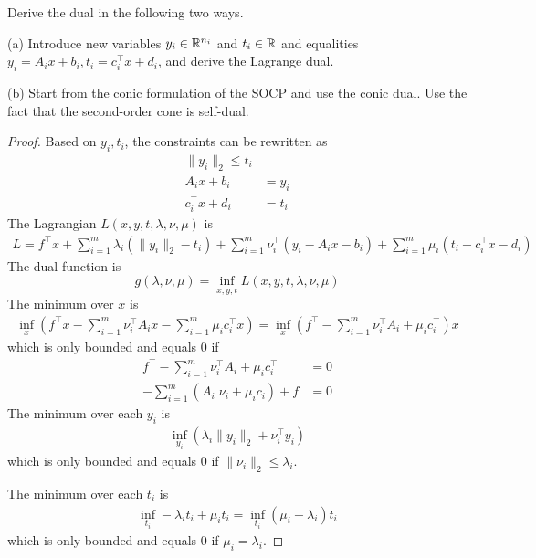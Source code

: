 \documentclass[11pt]{article}
\newcommand{\T}{^\top}          %
\begin{document}
Derive the dual in the following two ways.

(a) Introduce new variables $y_i\in{{\mathbb{R}}}^{n_i}$ and $t_i \in {{\mathbb{R}}}$ and equalities $y_i = A_i x + b_i, t_i = c_i\T x + d_i$, and derive the Lagrange dual.

(b) Start from the conic formulation of the SOCP and use the conic dual. Use the fact that the second-order cone is self-dual.

\begin{proof}
Based on $y_i, t_i$, the constraints can be rewritten as 
\begin{align*}
    \| y_i \|_2 \leq t_i \\
    A_i x + b_i &= y_i \\
    c_i^\top x + d_i &= t_i
\end{align*}
The Lagrangian $L(x, y, t, \lambda, \nu, \mu)$ is 
\begin{align*}
    L = f^\top x + \sum_{i=1}^m \lambda_i (\|y_i\|_2 - t_i) + \sum_{i=1}^m \nu_i^\top (y_i - A_i x - b_i) + \sum_{i=1}^m \mu_i (t_i - c_i^\top x - d_i)
\end{align*}
The dual function is 
\[
g(\lambda, \nu, \mu) = \inf_{x, y, t} L(x, y, t, \lambda, \nu, \mu)
\]
The minimum over $x$ is 
\begin{align*}
    \inf_x \left(  f^\top x - \sum_{i=1}^m \nu_i^\top A_i x - \sum_{i=1}^m \mu_i c_i^\top x \right)
    = \inf_x \left(f^\top - \sum_{i=1}^m \nu_i^\top A_i + \mu_i c_i^\top \right) x 
\end{align*}
which is only bounded and equals $0$ if 
\begin{align*}
    f^\top - \sum_{i=1}^m \nu_i^\top A_i + \mu_i c_i^\top &= 0 \\
    - \sum_{i=1}^m \left( A_i^\top \nu_i + \mu_i c_i \right) + f &= 0
\end{align*}
The minimum over each \(y_i\) is 
\begin{align*}
    \inf_{y_i} \left( \lambda_i \|y_i\|_2 + \nu_i^\top y_i \right)
\end{align*}
which is only bounded and equals $0$ if $\|\nu_i\|_2 \leq \lambda_i$.

The minimum over each \(t_i\) is 
\begin{align*}
    \inf_{t_i} -\lambda_i t_i + \mu_i t_i = \inf_{t_i} (\mu_i - \lambda_i) t_i
\end{align*}
which is only bounded and equals $0$ if $\mu_i = \lambda_i$.


\end{proof}
\end{document}
